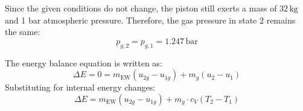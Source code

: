 Since the given conditions do not change, the piston still exerts a mass of \( 32 \, \text{kg} \) and 1 bar atmospheric pressure. Therefore, the gas pressure in state 2 remains the same:  
\[
p_{g,2} = p_{g,1} = 1.247 \, \text{bar}
\]

The energy balance equation is written as:  
\[
\Delta E = 0 = m_{\text{EW}} (u_{2g} - u_{1g}) + m_g (u_2 - u_1)
\]  
Substituting for internal energy changes:  
\[
\Delta E = m_{\text{EW}} (u_{2g} - u_{1g}) + m_g \cdot c_V (T_2 - T_1)
\]